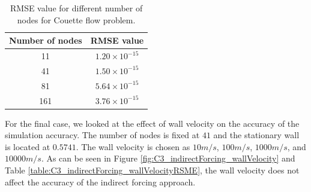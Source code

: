 %
%
\begin{table}[H]
\centering
\begin{tabular}{c | c}
     Number of nodes & RMSE value \\ \hline \hline
     11 & $1.20 \times 10^{-15}$ \\ \hline
     41 & $1.50 \times 10^{-15}$ \\ \hline
     81 & $5.64 \times 10^{-15}$ \\ \hline
     161 & $3.76 \times 10^{-15}$
\end{tabular}
\caption{RMSE value for different number of nodes for Couette flow problem.}
\label{table:C3_indirectForcing_nodeNumberRSME}
\end{table}
%
For the final case, we looked at the effect of wall velocity on the accuracy of the simulation accuracy. The number of nodes is fixed at $41$ and the stationary wall is located at $0.5741$. The wall velocity is chosen as $10 m/s$, $100 m/s$, $1000 m/s$, and $10000 m/s$. As can be seen in Figure \ref{fig:C3_indirectForcing_wallVelocity} and Table \ref{table:C3_indirectForcing_wallVelocityRSME}, the wall velocity does not affect the accuracy of the indirect forcing approach.
%
